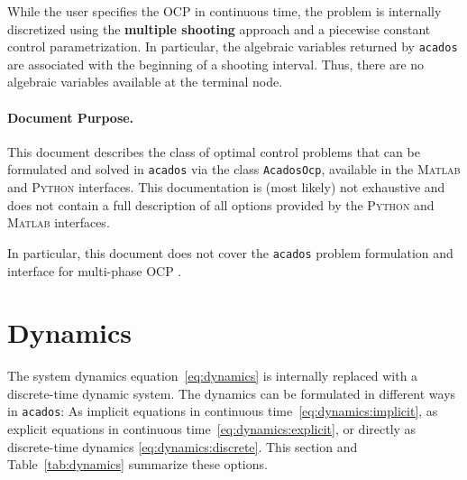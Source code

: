 \documentclass[english]{article}
\newcommand{\code}[1]{\texttt{#1}}
\newcommand{\acados}{\texttt{acados}}
\newcommand{\matlab}{\textsc{Matlab}}
\newcommand{\python}{\textsc{Python}}
\begin{document}
While the user specifies the OCP in continuous time, the problem is internally discretized using the \textbf{multiple shooting} approach and a piecewise constant control parametrization.
In particular, the algebraic variables returned by \acados{} are associated with the beginning of a shooting interval.
Thus, there are no algebraic variables available at the terminal node.

%

%
\paragraph{Document Purpose.}
This document describes the class of optimal control problems that can be formulated and solved in \acados{} via the class \texttt{AcadosOcp}, available in the \matlab{} and \python{} interfaces.
This documentation is (most likely) not exhaustive and does not contain a full description of all options provided by the \python{} and \matlab{} interfaces.

In particular, this document does not cover the \acados{} problem formulation and interface for multi-phase OCP \cite{frey2024multi}.




\section{Dynamics}\label{sec:dynamics}
%
%
The system dynamics equation~\eqref{eq:dynamics} is internally replaced with a discrete-time dynamic system.
The dynamics can be formulated in different ways in \acados:
As implicit equations in continuous time~\eqref{eq:dynamics:implicit}, as explicit equations in continuous time~\eqref{eq:dynamics:explicit}, or directly as discrete-time dynamics \eqref{eq:dynamics:discrete}.
This section and Table~\ref{tab:dynamics} summarize these options.
%
\end{document}

